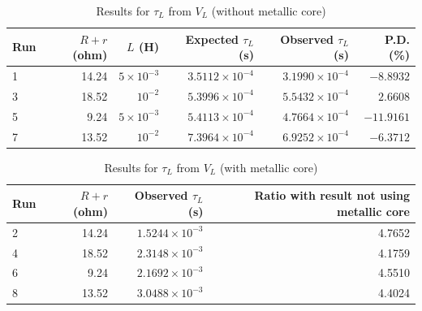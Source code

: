 \begin{table}[ht!]
    \begin{center}
        \begin{tabular}{|l|r|r|r|r|r|}
            \hline
            Run & $R+r$ (ohm) & $L$ (H) & Expected $\tau_{L}$ (s) & Observed $\tau_{L}$ (s) & P.D. (\%) \\
            \hline
            1 & 14.24 & $5 \times 10^{-3}$ & $3.5112 \times 10^{-4}$ & $3.1990 \times 10^{-4}$ & $-8.8932$ \\
            3 & 18.52 & $10^{-2}$ & $5.3996 \times 10^{-4}$ & $5.5432 \times 10^{-4}$ & $2.6608$ \\
            5 & 9.24 & $5 \times 10^{-3}$ & $5.4113 \times 10^{-4}$ & $4.7664 \times 10^{-4}$ & $-11.9161$ \\
            7 & 13.52 & $10^{-2}$ & $7.3964 \times 10^{-4}$ & $6.9252 \times 10^{-4}$ & $-6.3712$ \\
            \hline
        \end{tabular}
    \end{center}
    \caption{Results for $\tau_{L}$ from $V_{L}$ (without metallic core)}
\end{table}
\begin{table}[ht!]
    \begin{center}
        \begin{tabular}{|l|r|r|r|}
            \hline
            Run & $R+r$ (ohm) & Observed $\tau_{L}$ (s) & Ratio with result not using metallic core \\
            \hline
            2 & 14.24 & $1.5244 \times 10^{-3}$ & 4.7652 \\
            4 & 18.52 & $2.3148 \times 10^{-3}$ & 4.1759 \\
            6 & 9.24 & $2.1692 \times 10^{-3}$ & 4.5510 \\
            8 & 13.52 & $3.0488 \times 10^{-3}$ & 4.4024 \\
            \hline
        \end{tabular}
    \end{center}
    \caption{Results for $\tau_{L}$ from $V_{L}$ (with metallic core)}
\end{table}
\newpage
